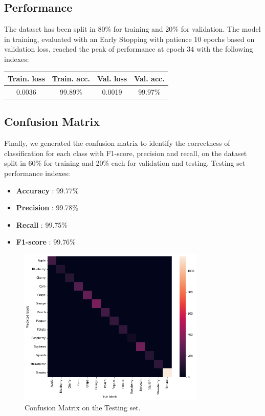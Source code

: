 \documentclass[conference,compsoc]{IEEEtran}
\begin{document}
\subsection{Performance}
The dataset has been split in 80\% for training and 20\% for validation. The model in training, evaluated with an Early Stopping with patience 10 epochs based on validation loss, reached the peak of performance at epoch 34 with the following indexes:

\begin{center}
\begin{tabular}{ c c | c c }
\hline\hline
  \textbf{Train. loss} & \textbf{Train. acc.} & \textbf{Val. loss} & \textbf{Val. acc.}   \\ 
\hline
 0.0036 & 99.89\% & 0.0019 & 99.97\%  \\  
\hline\hline
\end{tabular}
\end{center}

\subsection{Confusion Matrix}
Finally, we generated the confusion matrix to identify the correctness of classification for each class with F1-score, precision and recall, on the dataset split in 60\% for training and 20\% each for validation and testing. Testing set performance indexes:

\begin{itemize}
\item \textbf{Accuracy} : 99.77\%
\item \textbf{Precision} : 99.78\%
\item \textbf{Recall} : 99.75\%
\item \textbf{F1-score} : 99.76\%
\end{itemize}

\begin{figure}[h!]
\centering
\includegraphics[width=3.5in]{img/confusion_matrix.png}
\caption{Confusion Matrix on the Testing set.}
\label{fig_sim}
\end{figure}
\end{document}
